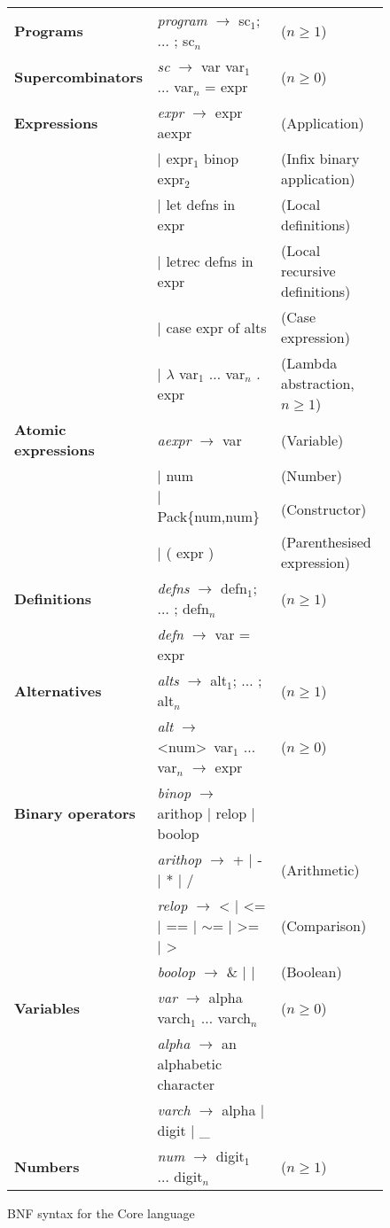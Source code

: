 \documentclass[11pt]{article}
\begin{document}
\begin{figure}
\centering
\begin{tabularx}{\textwidth}{llX}
\textbf{Programs} & \textit{program} $\rightarrow$ sc$_1$; $\ldots$ ; sc$_n$ & ($n \geq 1$) \\
\textbf{Supercombinators} & \textit{sc} $\rightarrow$ var var$_1$ $\ldots$ var$_n$ = expr & ($n \geq 0$) \\
\textbf{Expressions} & \textit{expr} $\rightarrow$ expr aexpr & (Application) \\
& $|$ expr$_1$ binop expr$_2$ & (Infix binary application) \\
& $|$ let defns in expr & (Local definitions) \\
& $|$ letrec defns in expr & (Local recursive definitions) \\
& $|$ case expr of alts & (Case expression) \\
& $|$ $\lambda$ var$_1$ $\ldots$ var$_n$ . expr & (Lambda abstraction, $n \geq 1$) \\
\textbf{Atomic expressions} & \textit{aexpr} $\rightarrow$ var & (Variable) \\
& $|$ num & (Number) \\
& $|$ Pack\{num,num\} & (Constructor) \\
& $|$ ( expr ) & (Parenthesised expression) \\
\textbf{Definitions} & \textit{defns} $\rightarrow$ defn$_1$; $\ldots$ ; defn$_n$ & ($n \geq 1$) \\
& \textit{defn} $\rightarrow$ var = expr \\
\textbf{Alternatives} & \textit{alts} $\rightarrow$ alt$_1$; $\ldots$ ; alt$_n$ & ($n \geq 1$) \\
& \textit{alt} $\rightarrow$ \textless num\textgreater\ var$_1$ $\ldots$ var$_n$ $\rightarrow$ expr & ($n \geq 0$) \\
\textbf{Binary operators} & \textit{binop} $\rightarrow$ arithop $|$ relop $|$ boolop \\
& \textit{arithop} $\rightarrow$ + $|$ - $|$ * $|$ / & (Arithmetic) \\
& \textit{relop} $\rightarrow$ < $|$ <= $|$ == $|$ $\sim$= $|$ >= $|$ > & (Comparison) \\
& \textit{boolop} $\rightarrow$ \& $|$ $|$ & (Boolean) \\
\textbf{Variables} & \textit{var} $\rightarrow$ alpha varch$_1$ $\ldots$ varch$_n$ & ($n \geq 0$) \\
& \textit{alpha} $\rightarrow$ an alphabetic character \\
& \textit{varch} $\rightarrow$ alpha $|$ digit $|$ \_ \\
\textbf{Numbers} & \textit{num} $\rightarrow$ digit$_1$ $\ldots$ digit$_n$ & ($n \geq 1$)
\end{tabularx}
\caption{BNF syntax for the Core language}
\label{fig:bnf}
\end{figure}
\end{document}
